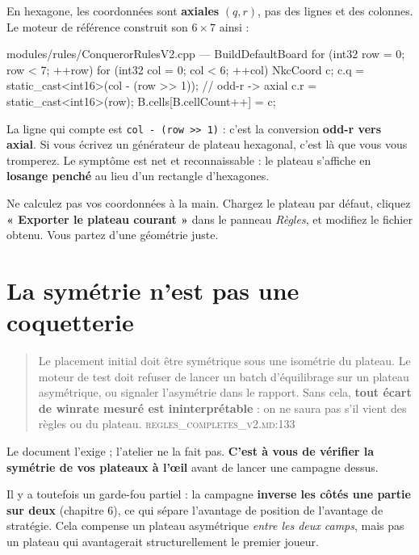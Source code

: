 En hexagone, les coordonnées sont \textbf{axiales} $(q, r)$, pas des lignes et des
colonnes. Le moteur de référence construit son $6\times7$ ainsi :

\begin{nkcode}{modules/rules/ConquerorRulesV2.cpp — BuildDefaultBoard}
for (int32 row = 0; row < 7; ++row) {
    for (int32 col = 0; col < 6; ++col) {
        NkcCoord c;
        c.q = static_cast<int16>(col - (row >> 1));  // odd-r -> axial
        c.r = static_cast<int16>(row);
        B.cells[B.cellCount++] = c;
    }
}
\end{nkcode}

La ligne qui compte est \texttt{col - (row >> 1)} : c'est la conversion
\textbf{odd-r vers axial}. Si vous écrivez un générateur de plateau hexagonal,
c'est là que vous vous tromperez. Le symptôme est net et reconnaissable : le
plateau s'affiche en \textbf{losange penché} au lieu d'un rectangle d'hexagones.

\begin{nkretenir}
Ne calculez pas vos coordonnées à la main. Chargez le plateau par défaut, cliquez
\textbf{« Exporter le plateau courant »} dans le panneau \emph{Règles}, et
modifiez le fichier obtenu. Vous partez d'une géométrie juste.
\end{nkretenir}

\section{La symétrie n'est pas une coquetterie}

\begin{quote}\small
Le placement initial doit être symétrique sous une isométrie du plateau. Le moteur
de test doit refuser de lancer un batch d'équilibrage sur un plateau asymétrique,
ou signaler l'asymétrie dans le rapport. Sans cela, \textbf{tout écart de winrate
mesuré est ininterprétable} : on ne saura pas s'il vient des règles ou du plateau.
\hfill\textsc{regles\_completes\_v2.md:133}
\end{quote}

\begin{nkpiege}
Le document l'exige ; l'atelier ne la fait pas. \textbf{C'est à vous de vérifier
la symétrie de vos plateaux à l'œil} avant de lancer une campagne dessus.

Il y a toutefois un garde-fou partiel : la campagne \textbf{inverse les côtés une
partie sur deux} (chapitre 6), ce qui sépare l'avantage de position de l'avantage
de stratégie. Cela compense un plateau asymétrique \emph{entre les deux camps},
mais pas un plateau qui avantagerait structurellement le premier joueur.
\end{nkpiege}

